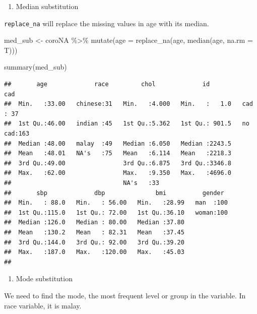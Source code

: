 \documentclass[
  10pt,
]{krantz}
\newenvironment{Shaded}{\begin{snugshade}}{\end{snugshade}}
\newcommand{\AttributeTok}[1]{\textcolor[rgb]{0.77,0.63,0.00}{#1}}
\newcommand{\FunctionTok}[1]{\textcolor[rgb]{0.00,0.00,0.00}{#1}}
\newcommand{\NormalTok}[1]{#1}
\newcommand{\OtherTok}[1]{\textcolor[rgb]{0.56,0.35,0.01}{#1}}
\newcommand{\SpecialCharTok}[1]{\textcolor[rgb]{0.00,0.00,0.00}{#1}}
\providecommand{\tightlist}{%
  \setlength{\itemsep}{0pt}\setlength{\parskip}{0pt}}
\begin{document}
\begin{enumerate}
\def\labelenumi{\arabic{enumi}.}
\setcounter{enumi}{1}
\tightlist
\item
  Median substitution
\end{enumerate}

\texttt{replace\_na} will replace the missing values in age with its median.

\begin{Shaded}
\begin{Highlighting}[]
\NormalTok{med\_sub }\OtherTok{\textless{}{-}} 
\NormalTok{  coroNA }\SpecialCharTok{\%\textgreater{}\%} 
  \FunctionTok{mutate}\NormalTok{(}\AttributeTok{age =} \FunctionTok{replace\_na}\NormalTok{(age, }\FunctionTok{median}\NormalTok{(age, }\AttributeTok{na.rm =}\NormalTok{ T)))}

\FunctionTok{summary}\NormalTok{(med\_sub)}
\end{Highlighting}
\end{Shaded}

\begin{verbatim}
##       age             race         chol             id             cad     
##  Min.   :33.00   chinese:31   Min.   :4.000   Min.   :   1.0   cad   : 37  
##  1st Qu.:46.00   indian :45   1st Qu.:5.362   1st Qu.: 901.5   no cad:163  
##  Median :48.00   malay  :49   Median :6.050   Median :2243.5               
##  Mean   :48.01   NA's   :75   Mean   :6.114   Mean   :2218.3               
##  3rd Qu.:49.00                3rd Qu.:6.875   3rd Qu.:3346.8               
##  Max.   :62.00                Max.   :9.350   Max.   :4696.0               
##                               NA's   :33                                   
##       sbp             dbp              bmi          gender   
##  Min.   : 88.0   Min.   : 56.00   Min.   :28.99   man  :100  
##  1st Qu.:115.0   1st Qu.: 72.00   1st Qu.:36.10   woman:100  
##  Median :126.0   Median : 80.00   Median :37.80              
##  Mean   :130.2   Mean   : 82.31   Mean   :37.45              
##  3rd Qu.:144.0   3rd Qu.: 92.00   3rd Qu.:39.20              
##  Max.   :187.0   Max.   :120.00   Max.   :45.03              
## 
\end{verbatim}

\begin{enumerate}
\def\labelenumi{\arabic{enumi}.}
\setcounter{enumi}{2}
\tightlist
\item
  Mode substitution
\end{enumerate}

We need to find the mode, the most frequent level or group in the variable. In race variable, it is malay.
\end{document}

